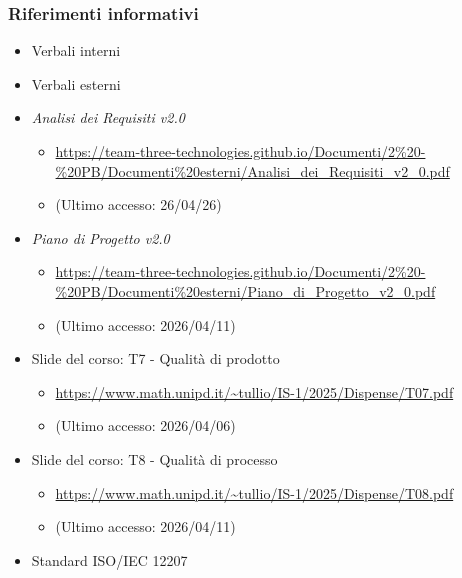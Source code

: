 \documentclass[a4paper,12pt]{article}
\begin{document}
{            \subsubsection{Riferimenti informativi}
                \begin{itemize}
                    \item Verbali interni
                    \item Verbali esterni
                    \item \textit{Analisi dei Requisiti v2.0}
                    \begin{itemize}
                        \item \url{https://team-three-technologies.github.io/Documenti/2%20-%20PB/Documenti%20esterni/Analisi_dei_Requisiti_v2_0.pdf}
                        \item[] (Ultimo accesso: 26/04/26)
                    \end{itemize}
                    \item \textit{Piano di Progetto v2.0}
                    \begin{itemize}
                        \item \url{https://team-three-technologies.github.io/Documenti/2%20-%20PB/Documenti%20esterni/Piano_di_Progetto_v2_0.pdf}
                        \item[] (Ultimo accesso: 2026/04/11)
                    \end{itemize}
                    \item Slide del corso: T7 - Qualità di prodotto
                    \begin{itemize}
                        \item \url{https://www.math.unipd.it/~tullio/IS-1/2025/Dispense/T07.pdf}
                         \item[] (Ultimo accesso: 2026/04/06)
                    \end{itemize}
                    \item Slide del corso: T8 - Qualità di processo
                    \begin{itemize}
                        \item \url{https://www.math.unipd.it/~tullio/IS-1/2025/Dispense/T08.pdf}
                        \item[] (Ultimo accesso: 2026/04/11)
                    \end{itemize}
                    \item Standard ISO/IEC 12207

\end{itemize}}
\end{document}
